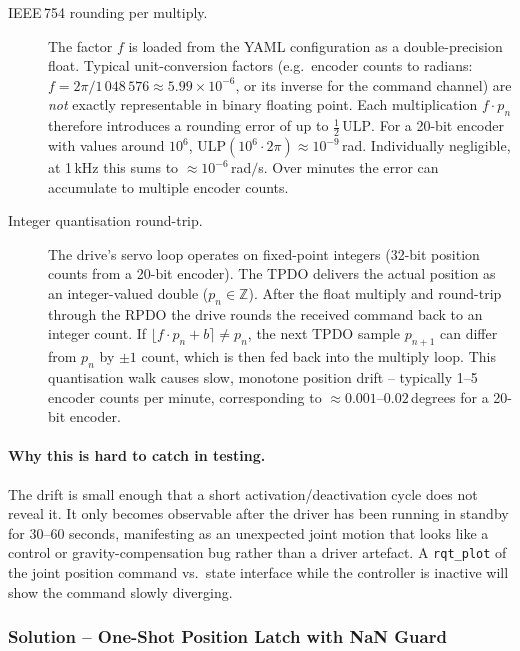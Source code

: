 \documentclass[11pt,a4paper]{article}
\begin{document}
\begin{description}
  \item[IEEE\,754 rounding per multiply.]
    The factor $f$ is loaded from the YAML configuration as a double-precision
    float.  Typical unit-conversion factors (e.g.\ encoder counts to radians:
    $f = 2\pi / 1\,048\,576 \approx 5.99 \times 10^{-6}$, or its inverse for
    the command channel) are \emph{not} exactly representable in binary
    floating point.  Each multiplication $f \cdot p_n$ therefore introduces a
    rounding error of up to $\tfrac{1}{2}\,\mathrm{ULP}$.  For a 20-bit
    encoder with values around $10^6$, ULP$(10^6 \cdot 2\pi) \approx 10^{-9}$\,rad.
    Individually negligible, at 1\,kHz this sums to $\approx 10^{-6}$\,rad$/$s.
    Over minutes the error can accumulate to multiple encoder counts.

  \item[Integer quantisation round-trip.]
    The drive's servo loop operates on fixed-point integers (32-bit position
    counts from a 20-bit encoder).  The TPDO delivers the actual position as
    an integer-valued double ($p_n \in \mathbb{Z}$).  After the float multiply
    and round-trip through the RPDO the drive rounds the received command back
    to an integer count.  If $\lfloor f \cdot p_n + b \rceil \neq p_n$, the
    next TPDO sample $p_{n+1}$ can differ from $p_n$ by $\pm 1$ count,
    which is then fed back into the multiply loop.  This quantisation walk
    causes slow, monotone position drift -- typically 1--5 encoder
    counts per minute, corresponding to
    $\approx 0.001$--$0.02$\,degrees for a 20-bit encoder.
\end{description}

\paragraph{Why this is hard to catch in testing.}
The drift is small enough that a short activation/deactivation cycle does not
reveal it.  It only becomes observable after the driver has been running in
standby for 30--60 seconds, manifesting as an unexpected joint motion that
looks like a control or gravity-compensation bug rather than a driver artefact.
A \texttt{rqt\_plot} of the joint position command vs.\ state interface while
the controller is inactive will show the command slowly diverging.

\subsubsection{Solution -- One-Shot Position Latch with NaN Guard}
\end{document}
